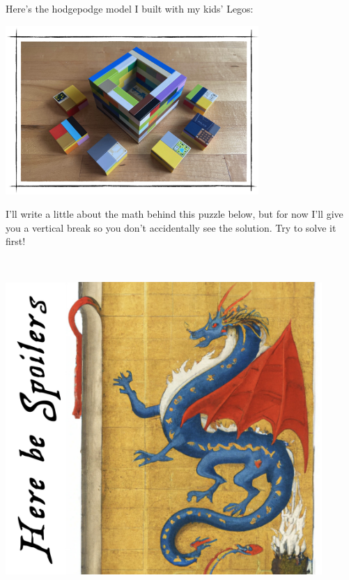 \documentclass[
]{article}
\begin{document}
Here's the hodgepodge model I built with my kids' Legos:

\begin{center}\includegraphics[width=0.72\textwidth]{img/home_model.jpg}\end{center}

I'll write a little about the math behind this puzzle below, but for now
I'll give you a vertical break so you don't accidentally see the
solution. Try to solve it first!

~ \vspace*{\fill}

\begin{center}\includegraphics[width=0.9\textwidth,height=\textheight]{img/here_be_spoilers.jpg}\end{center}

\vspace*{\fill}

~ \newpage
\end{document}
